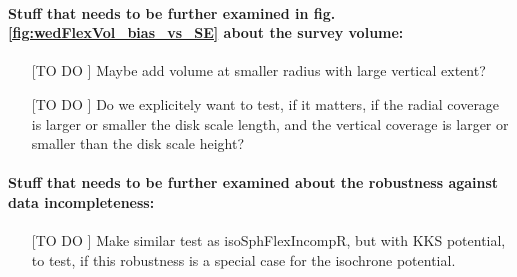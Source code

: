 \paragraph{Stuff that needs to be further examined in fig. \ref{fig:wedFlexVol_bias_vs_SE} about the survey volume:}
\begin{itemize}
\item[[TO DO]] Maybe add volume at smaller radius with large vertical extent?
\item[[TO DO]] Do we explicitely want to test, if it matters, if the radial coverage is larger or smaller the disk scale length, and the vertical coverage is larger or smaller than the disk scale height?
\end{itemize}

\paragraph{Stuff that needs to be further examined about the robustness against data incompleteness:}
\begin{itemize}
\item[[TO DO]] Make similar test as isoSphFlexIncompR, but with KKS potential, to test, if this robustness is a special case for the isochrone potential.
\end{itemize}


%



